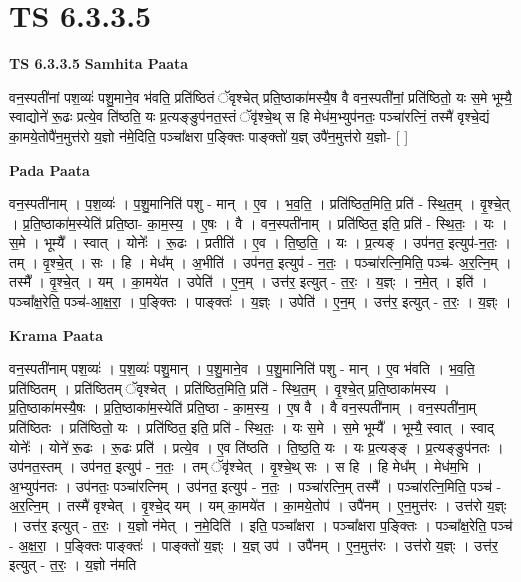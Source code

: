 \documentclass[17pt]{extarticle}
\begin{document}
\section{ TS 6.3.3.5 }

\textbf{TS 6.3.3.5 } \newline
\textbf{Samhita Paata} \newline

वन॒स्पती॑नां पश॒व्यः॑ पशु॒माने॒व भ॑वति॒ प्रति॑ष्ठितं ॅवृश्चेत् प्रति॒ष्ठाका॑मस्यै॒ष वै वन॒स्पती॑नां॒ प्रति॑ष्ठितो॒ यः स॒मे भूम्यै॒ स्वाद्योने॑ रू॒ढः प्रत्ये॒व ति॑ष्ठति॒ यः प्र॒त्यङ्ङुप॑नत॒स्तं ॅवृ॑श्चे॒थ् स हि मेध॑म॒भ्युप॑नतः॒ पञ्चा॑रत्निं॒ तस्मै॑ वृश्चे॒द्यं का॒मये॒तोपै॑न॒मुत्त॑रो य॒ज्ञो न॑मे॒दिति॒ पञ्चा᳚क्षरा प॒ङ्क्तिः पाङ्क्तो॑ य॒ज्ञ् उपै॑न॒मुत्त॑रो य॒ज्ञो- [  ] \newline

\textbf{Pada Paata} \newline

वन॒स्पती॑नाम् । प॒श॒व्यः॑ । प॒शु॒मानिति॑ पशु - मान् । ए॒व । भ॒व॒ति॒ । प्रति॑ष्ठित॒मिति॒ प्रति॑ - स्थि॒त॒म् । वृ॒श्चे॒त् । प्र॒ति॒ष्ठाका॑म॒स्येति॑ प्रति॒ष्ठा- का॒म॒स्य॒ । ए॒षः । वै । वन॒स्पती॑नाम् । प्रति॑ष्ठित॒ इति॒ प्रति॑ - स्थि॒तः॒ । यः । स॒मे । भूम्यै᳚ । स्वात् । योनेः᳚ । रू॒ढः । प्रतीति॑ । ए॒व । ति॒ष्ठ॒ति॒ । यः । प्र॒त्यङ् । उप॑नत॒ इत्युप॑-न॒तः॒ । तम् । वृ॒श्चे॒त् । सः । हि । मेध᳚म् । अ॒भीति॑ । उप॑नत॒ इत्युप॑ - न॒तः॒ । पञ्चा॑रत्नि॒मिति॒ पञ्च॑- अ॒र॒त्नि॒म् । तस्मै᳚ । वृ॒श्चे॒त् । यम् । का॒मये॑त । उपेति॑ । ए॒न॒म् । उत्त॑र॒ इत्युत् - त॒रः॒ । य॒ज्ञ्ः । न॒मे॒त् । इति॑ । पञ्चा᳚क्ष॒रेति॒ पञ्च॑-आ॒क्ष॒रा॒ । प॒ङ्क्तिः । पाङ्क्तः॑ । य॒ज्ञ्ः । उपेति॑ । ए॒न॒म् । उत्त॑र॒ इत्युत् - त॒रः॒ । य॒ज्ञ्ः ।  \newline


\textbf{Krama Paata} \newline

वन॒स्पती॑नाम् पश॒व्यः॑ । प॒श॒व्यः॑ पशु॒मान् । प॒शु॒माने॒व । प॒शु॒मानिति॑ पशु - मान् । ए॒व भ॑वति । भ॒व॒ति॒ प्रति॑ष्ठितम् । प्रति॑ष्ठितम् ॅवृश्चेत् । प्रति॑ष्ठित॒मिति॒ प्रति॑ - स्थि॒त॒म् । वृ॒श्चे॒त् प्र॒ति॒ष्ठाका॑मस्य । प्र॒ति॒ष्ठाका॑मस्यै॒षः । प्र॒ति॒ष्ठाका॑म॒स्येति॑ प्रति॒ष्ठा - का॒म॒स्य॒ । ए॒ष वै । वै वन॒स्पती॑नाम् । वन॒स्पती॑ना॒म् प्रति॑ष्ठितः । प्रति॑ष्ठितो॒ यः । प्रति॑ष्ठित॒ इति॒ प्रति॑ - स्थि॒तः॒ । यः स॒मे । स॒मे भूम्यै᳚ । भूम्यै॒ स्वात् । स्वाद् योनेः᳚ । योने॑ रू॒ढः । रू॒ढः प्रति॑ । प्रत्ये॒व । ए॒व ति॑ष्ठति । ति॒ष्ठ॒ति॒ यः । यः प्र॒त्यङ्‍ङ् । प्र॒त्यङ्‍ङुप॑नतः । उप॑नत॒स्तम् । उप॑नत॒ इत्युप॑ - न॒तः॒ । तम् ॅवृ॑श्चेत् । वृ॒श्चे॒थ् सः । स हि । हि मेध᳚म् । मेध॑म॒भि । अ॒भ्युप॑नतः । उप॑नतः॒ पञ्चा॑रत्निम् । उप॑नत॒ इत्युप॑ - न॒तः॒ । पञ्चा॑रत्नि॒म् तस्मै᳚ । पञ्चा॑रत्नि॒मिति॒ पञ्च॑ - अ॒र॒त्नि॒म् । तस्मै॑ वृश्चेत् । वृ॒श्चे॒द् यम् । यम् का॒मये॑त । का॒मये॒तोप॑ । उपै॑नम् । ए॒न॒मुत्त॑रः । उत्त॑रो य॒ज्ञ्ः । उत्त॑र॒ इत्युत् - त॒रः॒ । य॒ज्ञो न॑मेत् । न॒मे॒दिति॑ । इति॒ पञ्चा᳚क्षरा । पञ्चा᳚क्षरा प॒ङ्‍क्तिः । पञ्चा᳚क्ष॒रेति॒ पञ्च॑ - अ॒क्ष॒रा॒ । प॒ङ्‍क्तिः पाङ्‍क्तः॑ । पाङ्‍क्तो॑ य॒ज्ञ्ः । य॒ज्ञ् उप॑ । उपै॑नम् । ए॒न॒मुत्त॑रः । उत्त॑रो य॒ज्ञ्ः । उत्त॑र॒ इत्युत् - त॒रः॒ । य॒ज्ञो न॑मति \newline
\end{document}

